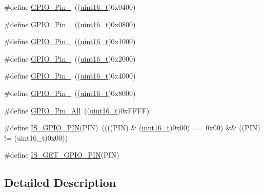 \begin{DoxyCompactItemize}
\item 
\#define \hyperlink{group___g_p_i_o__pins__define_ga726af6407ba60ac60f02057227c2d348}{G\+P\+I\+O\+\_\+\+Pin\+\_}~((\hyperlink{_p_e___types_8h_a1f1825b69244eb3ad2c7165ddc99c956}{uint16\+\_\+t})0x0400)
\item 
\#define \hyperlink{group___g_p_i_o__pins__define_ga5139d5bc3d15784ae7794ed2ae1ff767}{G\+P\+I\+O\+\_\+\+Pin\+\_}~((\hyperlink{_p_e___types_8h_a1f1825b69244eb3ad2c7165ddc99c956}{uint16\+\_\+t})0x0800)
\item 
\#define \hyperlink{group___g_p_i_o__pins__define_gada91257dcaab2c86f75fbd8e4b52b98c}{G\+P\+I\+O\+\_\+\+Pin\+\_}~((\hyperlink{_p_e___types_8h_a1f1825b69244eb3ad2c7165ddc99c956}{uint16\+\_\+t})0x1000)
\item 
\#define \hyperlink{group___g_p_i_o__pins__define_ga4155a41c433f3657b9c79cfbd4240966}{G\+P\+I\+O\+\_\+\+Pin\+\_}~((\hyperlink{_p_e___types_8h_a1f1825b69244eb3ad2c7165ddc99c956}{uint16\+\_\+t})0x2000)
\item 
\#define \hyperlink{group___g_p_i_o__pins__define_ga21cd1d89c0c061a6f09c5a842610bee5}{G\+P\+I\+O\+\_\+\+Pin\+\_}~((\hyperlink{_p_e___types_8h_a1f1825b69244eb3ad2c7165ddc99c956}{uint16\+\_\+t})0x4000)
\item 
\#define \hyperlink{group___g_p_i_o__pins__define_gae686a9fc47cf3e420e5db0784210711d}{G\+P\+I\+O\+\_\+\+Pin\+\_}~((\hyperlink{_p_e___types_8h_a1f1825b69244eb3ad2c7165ddc99c956}{uint16\+\_\+t})0x8000)
\item 
\#define \hyperlink{group___g_p_i_o__pins__define_gaba3e915ddca17a1211edc07b7fd97e8b}{G\+P\+I\+O\+\_\+\+Pin\+\_\+\+All}~((\hyperlink{_p_e___types_8h_a1f1825b69244eb3ad2c7165ddc99c956}{uint16\+\_\+t})0x\+F\+F\+F\+F)
\item 
\#define \hyperlink{group___g_p_i_o__pins__define_gad6ec74e33360395535ad5d91ba6d4781}{I\+S\+\_\+\+G\+P\+I\+O\+\_\+\+P\+IN}(P\+IN)~((((P\+IN) \& (\hyperlink{_p_e___types_8h_a1f1825b69244eb3ad2c7165ddc99c956}{uint16\+\_\+t})0x00) == 0x00) \&\& ((\+P\+I\+N) != (uint16\+\_\+t)0x00))
\item 
\#define \hyperlink{group___g_p_i_o__pins__define_gaddf7154b7f30b7c0a70f3aeaff5ddffc}{I\+S\+\_\+\+G\+E\+T\+\_\+\+G\+P\+I\+O\+\_\+\+P\+IN}(P\+IN)
\end{DoxyCompactItemize}


\subsection{Detailed Description}


